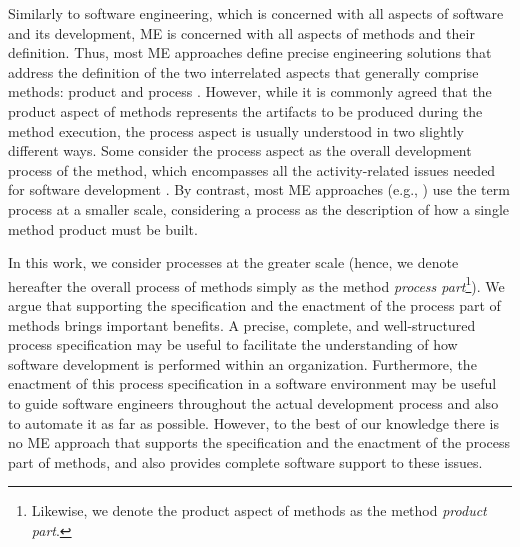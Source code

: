 \documentclass[runningheads,a4paper]{llncs}
\begin{document}
Similarly to software engineering, which is concerned with all aspects of
software and its development, ME is concerned with all aspects of methods and
their definition. Thus, most ME approaches define precise engineering solutions
that address the definition of the two interrelated aspects that generally
comprise methods: product and process \cite{Brinkkemper99,Prakash97,Ralyte01a}.
However, while it is commonly agreed that the product aspect of methods
represents the artifacts to be produced during the method execution, the process
aspect is usually understood in two slightly different ways. Some consider the
process aspect as the overall development process of the method, which
encompasses all the activity-related issues needed for software development
\cite{Niknafs09}. By contrast, most ME approaches (e.g.,
\cite{Brinkkemper99,Karlsson09,Prakash99,Ralyte01a}) use the term process at a
smaller scale, considering a process as the description of how a single method
product must be built.

In this work, we consider processes at the greater scale (hence, we denote
hereafter the overall process of methods simply as the method \textit{process
part}\footnote{Likewise, we denote the product aspect of methods as the method
\textit{product part}.}). We argue that supporting the specification and the
enactment of the process part of methods brings important benefits. A
precise, complete, and well-structured process specification may be useful to
facilitate the understanding of how software development is performed within an
organization. Furthermore, the enactment of this process specification in a
software environment may be useful to guide software engineers throughout the
actual development process and also to automate it as far as possible. However,
to the best of our knowledge there is no ME approach that supports the
specification and the enactment of the process part of methods, and also
provides complete software support to these issues.
\end{document}

